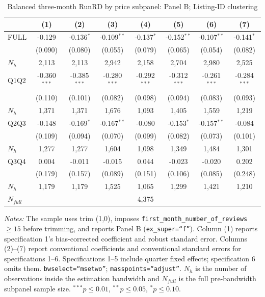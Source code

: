 \begin{table}[!htbp]
\centering
\caption{Balanced three-month RunRD by price subpanel: Panel B; Listing-ID clustering}
\scriptsize
\setlength{\tabcolsep}{5pt}
\begin{tabular}{l*{7}{c}}
\toprule
 & (1) & (2) & (3) & (4) & (5) & (6) & (7) \\
\midrule
FULL & -0.129 & -0.136$^{*}$ & -0.109$^{**}$ & -0.137$^{*}$ & -0.152$^{**}$ & -0.107$^{**}$ & -0.141$^{*}$ \\
 & (0.090) & (0.080) & (0.055) & (0.079) & (0.065) & (0.054) & (0.082) \\
$N_h$ & 2,113 & 2,113 & 2,942 & 2,158 & 2,704 & 2,980 & 2,525 \\
\addlinespace
Q1Q2 & -0.360$^{***}$ & -0.385$^{***}$ & -0.280$^{***}$ & -0.292$^{***}$ & -0.312$^{***}$ & -0.261$^{***}$ & -0.284$^{***}$ \\
 & (0.110) & (0.101) & (0.082) & (0.098) & (0.094) & (0.083) & (0.093) \\
$N_h$ & 1,371 & 1,371 & 1,676 & 1,093 & 1,405 & 1,559 & 1,219 \\
\addlinespace
Q2Q3 & -0.148 & -0.169$^{*}$ & -0.167$^{**}$ & -0.080 & -0.153$^{*}$ & -0.157$^{**}$ & -0.084 \\
 & (0.109) & (0.094) & (0.070) & (0.099) & (0.082) & (0.073) & (0.101) \\
$N_h$ & 1,277 & 1,277 & 1,604 & 1,098 & 1,349 & 1,484 & 1,301 \\
\addlinespace
Q3Q4 & 0.004 & -0.011 & -0.015 & 0.044 & -0.023 & -0.020 & 0.202 \\
 & (0.179) & (0.157) & (0.089) & (0.151) & (0.106) & (0.085) & (0.248) \\
$N_h$ & 1,179 & 1,179 & 1,525 & 1,065 & 1,299 & 1,421 & 1,210 \\

\midrule
$N_{full}$ & \multicolumn{7}{c}{4,375} \\
\bottomrule
\end{tabular}
\begin{minipage}{0.98\textwidth}
\footnotesize
\textit{Notes:} The sample uses trim (1,0), imposes \texttt{first\_month\_number\_of\_reviews}$\geq15$ before trimming, and reports Panel B (\texttt{ex\_super=``f''}). Column (1) reports specification 1's bias-corrected coefficient and robust standard error. Columns (2)--(7) report conventional coefficients and conventional standard errors for specifications 1--6. Specifications 1--5 include quarter fixed effects; specification 6 omits them. \texttt{bwselect=``msetwo''}; \texttt{masspoints=``adjust''}. $N_h$ is the number of observations inside the estimation bandwidth and $N_{full}$ is the full pre-bandwidth subpanel sample size. $^{***}p\leq0.01$, $^{**}p\leq0.05$, $^{*}p\leq0.10$.
\end{minipage}
\end{table}
\clearpage
